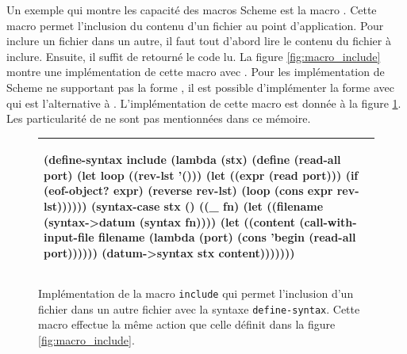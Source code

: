 Un exemple qui montre les capacité des macros Scheme est la macro
.  Cette macro permet l'inclusion du contenu d'un fichier au
point d'application.  Pour inclure un fichier dans un autre, il faut tout
d'abord lire le contenu du fichier à inclure. Ensuite, il suffit de retourné le
code lu. La figure \ref{fig:macro_include} montre une implémentation de cette
macro avec .  Pour les implémentation de Scheme ne
supportant pas la forme , il est possible d'implémenter
la forme  avec  qui est l'alternative à
. L'implémentation de cette macro est donnée à la figure
\ref{fig:macro_include_def_syntax}. Les particularité de
 ne sont pas mentionnées dans ce mémoire.



\begin{figure}[ht]
\begin{tabular}{|l|}\hline
\begin{mplisting}{0.8}
(define-syntax include
  (lambda (stx)
    (define (read-all port)
      (let loop ((rev-lst '()))
        (let ((expr (read port)))
          (if (eof-object? expr)
            (reverse rev-lst)
            (loop (cons expr rev-lst))))))
    (syntax-case stx ()
      ((_ fn)
       (let ((filename (syntax->datum (syntax fn))))
         (let ((content
                 (call-with-input-file
                    filename
                    (lambda (port)
                      (cons 'begin (read-all port))))))
           (datum->syntax stx content)))))))
\end{mplisting}\\\hline

\end{tabular}
   \caption{Implémentation de la macro \texttt{include} qui permet l'inclusion
   d'un fichier dans un autre fichier avec la syntaxe \texttt{define-syntax}.
   Cette macro effectue la même action que celle définit dans la figure
   \ref{fig:macro_include}.}

   \label{fig:macro_include_def_syntax}
\end{figure}

